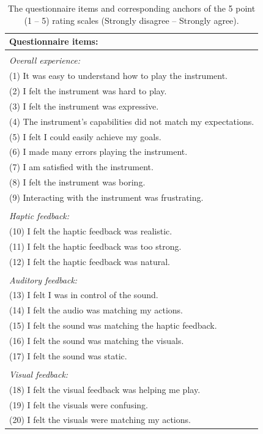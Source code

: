 \begin{table}[h]
\centering
    \small
    \begin{tabular}{p{}}
    \textbf{Questionnaire items:} \\
    \hline
    \\[-0.1in]
    \textit{Overall experience:} \\
    (1) It was easy to understand how to play the instrument.\\
    (2) I felt the instrument was hard to play.\\
    (3) I felt the instrument was expressive.\\
    (4) The instrument's capabilities did not match my expectations.\\
    (5) I felt I could easily achieve my goals.\\
    (6) I made many errors playing the instrument.\\
    (7) I am satisfied with the instrument.\\
    (8) I felt the instrument was boring.\\
    (9) Interacting with the instrument was frustrating.\\
    \hline
    \\[-0.1in]
    \textit{Haptic feedback:}  \\
    (10) I felt the haptic feedback was realistic.\\
    (11) I felt the haptic feedback was too strong.\\
    (12) I felt the haptic feedback was natural.\\
    \hline
    \\[-0.1in]
    \textit{Auditory feedback:}\\
    (13) I felt I was in control of the sound.\\
    (14) I felt the audio was matching my actions.\\
    (15) I felt the sound was matching the haptic feedback.\\
    (16) I felt the sound was matching the visuals.\\ 
    (17) I felt the sound was static.\\ 
    \hline
    \\[-0.1in]
    \textit{Visual feedback:}\\
    (18) I felt the visual feedback was helping me play.\\
    (19) I felt the visuals were confusing.\\
    (20) I felt the visuals were matching my actions.\\
    
    \hline
    \end{tabular}%
        \caption{The questionnaire items and corresponding anchors of the 5 point (1 -- 5) rating scales (Strongly disagree -- Strongly agree).}
    \label{tab:questions}
\end{table}
%
